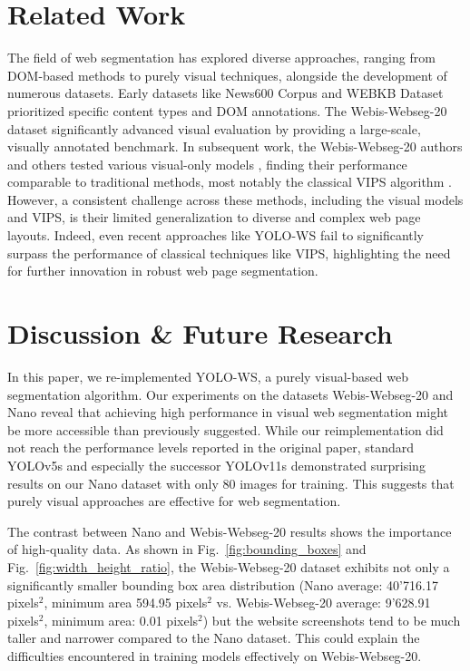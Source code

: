 \documentclass[conference]{IEEEtran}
\begin{document}
\section{Related Work}
The field of web segmentation has explored diverse approaches, ranging from DOM-based methods to purely visual techniques, alongside the development of numerous datasets. Early datasets like News600 Corpus \cite{spengler} and WEBKB Dataset \cite{pasupathi} prioritized specific content types and DOM annotations. The Webis-Webseg-20 dataset \cite{kiesel:2020b} significantly advanced visual evaluation by providing a large-scale, visually annotated benchmark. In subsequent work, the Webis-Webseg-20 authors and others tested various visual-only models \cite{kiesel:2021a, cormer, chen2019mmdetection}, finding their performance comparable to traditional methods, most notably the classical VIPS algorithm \cite{VIPS}.  However, a consistent challenge across these methods, including the visual models and VIPS, is their limited generalization to diverse and complex web page layouts. Indeed, even recent approaches like YOLO-WS fail to significantly surpass the performance of classical techniques like VIPS, highlighting the need for further innovation in robust web page segmentation.

\section{Discussion \& Future Research}
In this paper, we re-implemented YOLO-WS, a purely visual-based web segmentation algorithm. Our experiments on the datasets Webis-Webseg-20 and Nano reveal that achieving high performance in visual web segmentation might be more accessible than previously suggested. While our reimplementation did not reach the performance levels reported in the original paper, standard YOLOv5s and especially the successor YOLOv11s demonstrated surprising results on our Nano dataset with only 80 images for training. This suggests that purely visual approaches are effective for web segmentation. 

The contrast between Nano and Webis-Webseg-20 results shows the importance of high-quality data. As shown in Fig.~\ref{fig:bounding_boxes} and Fig.~\ref{fig:width_height_ratio}, the Webis-Webseg-20 dataset exhibits not only a significantly smaller bounding box area distribution (Nano average: 40'716.17 pixels$^2$, minimum area 594.95 pixels$^2$ vs. Webis-Webseg-20 average: 9'628.91 pixels$^2$, minimum area: 0.01 pixels$^2$) but the website screenshots tend to be much taller and narrower compared to the Nano dataset. This could explain the difficulties encountered in training models effectively on Webis-Webseg-20.
\end{document}
